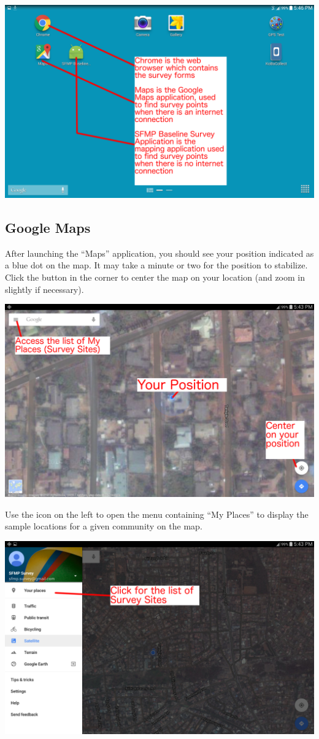 \documentclass[a4paper]{refart}
\begin{document}
\includegraphics[width=\textwidth]{applauncher1.png}


\subsection{Google Maps}
After launching the ``Maps'' application, you should see your position indicated as a blue dot on the map. It may take a minute or two for the position to stabilize. Click the button in the corner to center the map on your location (and zoom in slightly if necessary).

\includegraphics[width=\textwidth]{googlemaps1.png}

Use the icon on the left to open the menu containing ``My Places'' to display the sample locations for a given community on the map.

\includegraphics[width=\textwidth]{googlemaps2.png}
\end{document}
